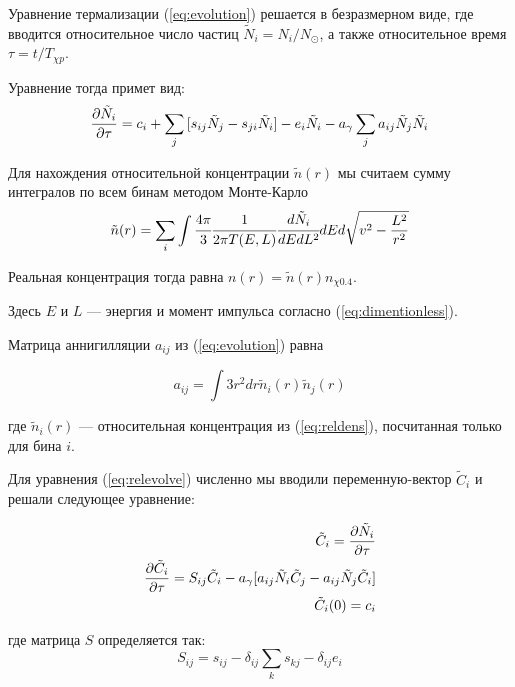 Уравнение термализации (\ref{eq:evolution}) решается в безразмерном виде, где вводится относительное число частиц $\tilde{N}_i = N_i/N_{\odot}$, а также относительное время $\tau = t/T_{\chi p}$.

Уравнение тогда примет вид:
\begin{equation}
	\label{eq:relevolve}
	\frac{\partial \tilde{N}_i}{\partial \tau} = c_i +
	\sum_j{[s_{ij} \tilde{N}_{j} - s_{ji} \tilde{N}_{i} ]} - e_{i} \tilde{N}_i - a_{\gamma} \sum_j {a_{ij} \tilde{N}_j \tilde{N}_i}
\end{equation}

Для нахождения относительной концентрации $\tilde{n}(r)$ мы считаем сумму интегралов по всем бинам методом Монте-Карло
\begin{equation}
	\label{eq:reldens}
	\tilde{n}(r) = \sum_i{\int{\cfrac{4\pi}{3} \cfrac{1}{2\pi T(E,L)} \cfrac{d\tilde{N}_i}{dEdL^2} dE d\sqrt{v^2-\frac{L^2}{r^2}} }}
\end{equation}

Реальная концентрация тогда равна $n(r) = \tilde{n}(r) n_{\chi 0.4}$. 

Здесь $E$ и $L$ --- энергия и момент импульса согласно (\ref{eq:dimentionless}). 

Матрица аннигилляции $a_{ij}$ из (\ref{eq:evolution}) равна

\begin{equation}
	a_{ij} = \int{3r^2dr \tilde{n}_i(r)\tilde{n}_j(r)}
\end{equation}

где $\tilde{n}_i(r)$ --- относительная концентрация из (\ref{eq:reldens}), посчитанная только для бина $i$.


Для уравнения (\ref{eq:relevolve}) численно мы вводили переменную-вектор $\tilde{C}_{i}$ и решали следующее уравнение:

\begin{equation}
\begin{split}
	\tilde{C}_i = \frac{\partial \tilde{N}_i}{\partial \tau} \\
	\frac{\partial \tilde{C}_i}{\partial \tau} = S_{ij} \tilde{C}_{i} - a_{\gamma} [a_{ij} \tilde{N}_i \tilde{C}_{j} - a_{ij} \tilde{N}_j \tilde{C}_{i}] \\
	\tilde{C}_i(0) = c_i
\end{split}
\end{equation}

где матрица $S$ определяется так:
\begin{equation}
	S_{ij} = s_{ij} - \delta_{ij} \sum_{k}{s_{kj}} - \delta_{ij} e_{i}
\end{equation}

